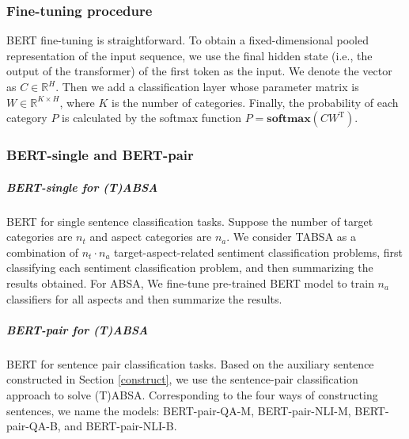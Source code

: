 \documentclass[11pt,a4paper]{article}
\theoremstyle{definition}
\def\tran{^\mathrm{\scriptscriptstyle T}}
\begin{document}
	\subsubsection{Fine-tuning procedure} BERT fine-tuning is straightforward. To obtain a fixed-dimensional pooled representation of the input sequence, we use the final hidden state (i.e., the output of the transformer) of the first token as the input. We denote the vector as $C \in \mathbb{R}^H$. Then we add a classification layer whose parameter matrix is $W \in \mathbb{R}^{K \times H}$, where $K$ is the number of categories. Finally, the probability of each category $P$ is calculated by the softmax function $P=\mathbf{softmax}(CW\tran)$.
	
	\subsubsection{BERT-single and BERT-pair}
	\subparagraph{BERT-single for (T)ABSA} BERT for single sentence classification tasks. Suppose the number of target categories are $n_t$ and aspect categories are $n_a$. We consider TABSA as a combination of $n_t \cdot n_a$ target-aspect-related sentiment classification problems, first classifying each sentiment classification problem, and then summarizing the results obtained. For ABSA, We fine-tune pre-trained BERT model to train $n_a$ classifiers for all aspects and then summarize the results.
	
	\subparagraph{BERT-pair for (T)ABSA} BERT for sentence pair classification tasks. Based on the auxiliary sentence constructed in Section \ref{construct}, we use the sentence-pair classification approach to solve (T)ABSA. Corresponding to the four ways of constructing sentences, we name the models: BERT-pair-QA-M, BERT-pair-NLI-M, BERT-pair-QA-B, and BERT-pair-NLI-B.
	
	
\end{document}
